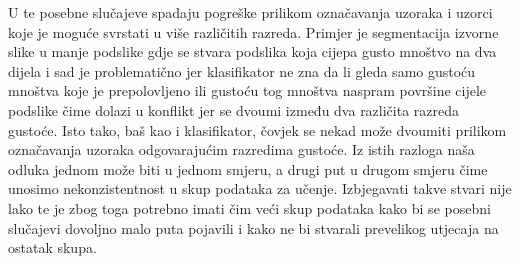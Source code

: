 \documentclass[times, utf8, zavrsni]{fer}
\begin{document}
\bigbreak

U te posebne slučajeve
spadaju pogreške prilikom označavanja uzoraka i uzorci koje je moguće svrstati u više različitih razreda. Primjer je
segmentacija izvorne slike u manje podslike gdje se stvara podslika koja cijepa gusto mnoštvo na dva dijela
i sad je problematično jer klasifikator ne zna da li gleda samo gustoću mnoštva koje je prepolovljeno ili gustoću 
tog mnoštva naspram površine cijele podslike čime dolazi u konflikt jer se dvoumi između dva različita razreda gustoće.
Isto tako, baš kao i klasifikator, čovjek se nekad može dvoumiti prilikom označavanja uzoraka
odgovarajućim razredima gustoće. Iz istih razloga naša odluka jednom može biti u jednom smjeru, a 
drugi put u drugom smjeru čime unosimo nekonzistentnost u skup podataka za učenje. Izbjegavati takve
stvari nije lako te je zbog toga potrebno imati čim veći skup podataka kako bi se posebni slučajevi
dovoljno malo puta pojavili i kako ne bi stvarali prevelikog utjecaja na ostatak skupa. 
\end{document}
